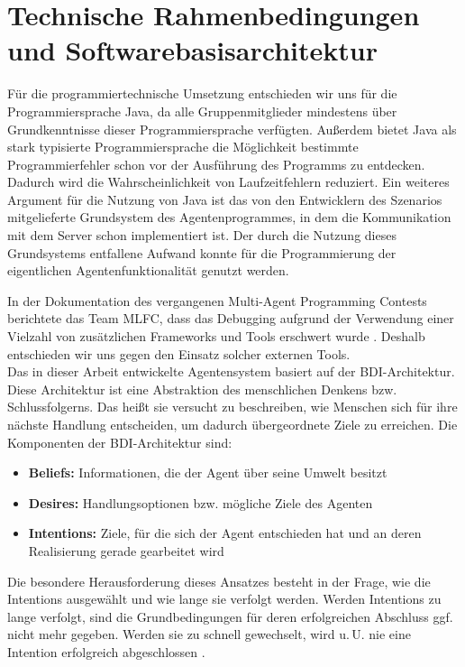 \documentclass[runningheads]{llncs}
\begin{document}
\section{Technische Rahmenbedingungen und Softwarebasisarchitektur}
Für die programmiertechnische Umsetzung entschieden wir uns für die Programmiersprache Java, da alle Gruppenmitglieder mindestens über Grundkenntnisse dieser Programmiersprache verfügten. Außerdem bietet Java als stark typisierte Programmiersprache die Möglichkeit bestimmte Programmierfehler schon vor der Ausführung des Programms zu entdecken. Dadurch wird die Wahrscheinlichkeit von Laufzeitfehlern reduziert. Ein weiteres Argument für die Nutzung von Java ist das von den Entwicklern des Szenarios mitgelieferte Grundsystem des Agentenprogrammes, in dem die Kommunikation mit dem Server schon implementiert ist. Der durch die Nutzung dieses Grundsystems entfallene Aufwand konnte für die Programmierung der eigentlichen Agentenfunktionalität genutzt werden.

In der Dokumentation des vergangenen Multi-Agent Programming Contests berichtete das Team MLFC, dass das Debugging aufgrund der Verwendung einer Vielzahl von zusätzlichen Frameworks und Tools erschwert wurde \cite{Ahlbrecht2021}. Deshalb entschieden wir uns gegen den Einsatz solcher externen Tools.\\

Das in dieser Arbeit entwickelte Agentensystem basiert auf der BDI-Architektur. Diese Architektur ist eine Abstraktion des menschlichen Denkens bzw. Schlussfolgerns. Das heißt sie versucht zu beschreiben, wie Menschen sich für ihre nächste Handlung entscheiden, um dadurch übergeordnete Ziele zu erreichen. Die Komponenten der BDI-Architektur sind:
\begin{itemize}
\item{{\bf Beliefs:} Informationen, die der Agent über seine Umwelt besitzt}
\item{{\bf Desires:} Handlungsoptionen bzw. mögliche Ziele des Agenten}
\item{{\bf Intentions:} Ziele, für die sich der Agent entschieden hat und an deren Realisierung gerade gearbeitet wird}
\end{itemize}

Die besondere Herausforderung dieses Ansatzes besteht in der Frage, wie die Intentions ausgewählt und wie lange sie verfolgt werden. Werden Intentions zu lange verfolgt, sind die Grundbedingungen für deren erfolgreichen Abschluss ggf. nicht mehr gegeben. Werden sie zu schnell gewechselt, wird u.\,U. nie eine Intention erfolgreich abgeschlossen \cite{Weiss2000}.
\end{document}
